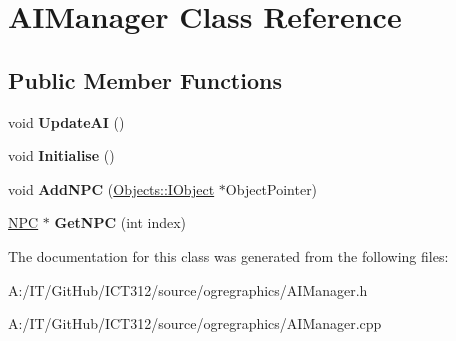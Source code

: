 \hypertarget{class_a_i_manager}{\section{A\-I\-Manager Class Reference}
\label{class_a_i_manager}
}
\subsection*{Public Member Functions}
\begin{DoxyCompactItemize}
\item 
\hypertarget{class_a_i_manager_af99b2cc614087185d6f8a74b8c80111b}{void {\bfseries Update\-A\-I} ()}\label{class_a_i_manager_af99b2cc614087185d6f8a74b8c80111b}

\item 
\hypertarget{class_a_i_manager_af7caaeaa220cf5f36e82c036b50ad378}{void {\bfseries Initialise} ()}\label{class_a_i_manager_af7caaeaa220cf5f36e82c036b50ad378}

\item 
\hypertarget{class_a_i_manager_a48977d671aed1b9e7d47deba33660b36}{void {\bfseries Add\-N\-P\-C} (\hyperlink{class_objects_1_1_i_object}{Objects\-::\-I\-Object} $\ast$Object\-Pointer)}\label{class_a_i_manager_a48977d671aed1b9e7d47deba33660b36}

\item 
\hypertarget{class_a_i_manager_adf5c673a55397d734aac9ddcb29dc1c0}{\hyperlink{class_n_p_c}{N\-P\-C} $\ast$ {\bfseries Get\-N\-P\-C} (int index)}\label{class_a_i_manager_adf5c673a55397d734aac9ddcb29dc1c0}

\end{DoxyCompactItemize}


The documentation for this class was generated from the following files\-:\begin{DoxyCompactItemize}
\item 
A\-:/\-I\-T/\-Git\-Hub/\-I\-C\-T312/source/ogregraphics/A\-I\-Manager.\-h\item 
A\-:/\-I\-T/\-Git\-Hub/\-I\-C\-T312/source/ogregraphics/A\-I\-Manager.\-cpp\end{DoxyCompactItemize}
